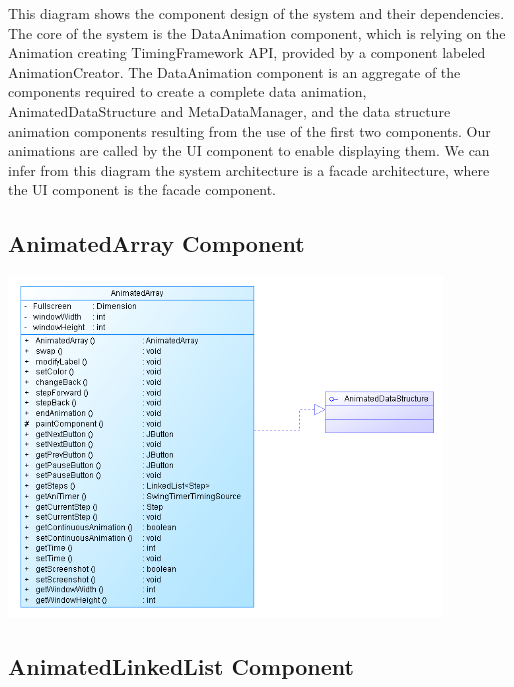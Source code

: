 \documentclass{l3proj}
\begin{document}
This diagram shows the component design of the system and their dependencies. The core of the system is the DataAnimation component,
which is relying on the Animation creating TimingFramework API, provided by a component labeled AnimationCreator.
The DataAnimation component is an aggregate of the components required to create a complete data animation, AnimatedDataStructure and MetaDataManager, and the data structure animation components
resulting from the use of the first two components. Our animations are called by the UI component to enable displaying them.
We can infer from this diagram the system architecture is a facade architecture, where the UI component is the facade component.

\subsection{AnimatedArray Component}
\includegraphics[width=115mm]{images/arrayDiagram.png}
\subsection{AnimatedLinkedList Component}
\end{document}
